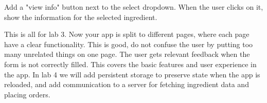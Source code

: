 \documentclass[fleqn, article, a4paper]{memoir}
\begin{document}
\begin{Assignments}
Add a "view info" button next to the select dropdown. When the user clicks on it, show the information for the selected ingredient.

\item This is all for lab 3. Now your app is split to different pages, where each page have a clear functionality. This is good, do not confuse the user by putting too many unrelated things on one page. The user gets relevant feedback when the form is not correctly filled. This covers the basic features and user experience in the app. In lab 4 we will add persistent storage to preserve state when the app is reloaded, and add communication to a server for fetching ingredient data and placing orders.

\end{Assignments}


\end{document}

